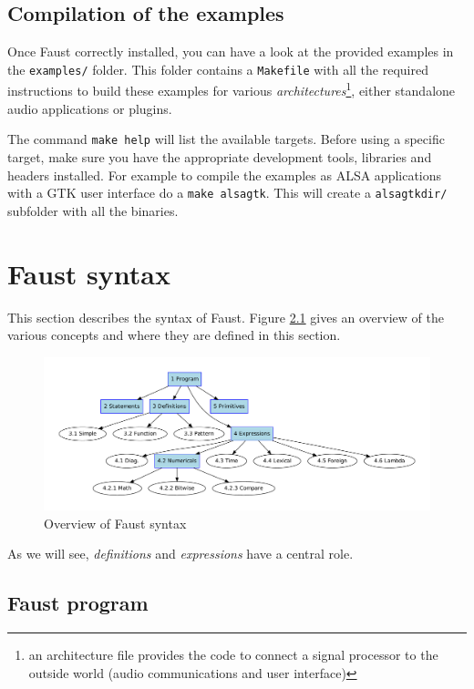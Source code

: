 \documentclass[a4paper]{book}
\begin{document}
\section{Compilation of the examples}
Once Faust correctly installed, you can have a look at the provided examples in the \lstinline'examples/' folder. This folder contains a  \lstinline'Makefile' with all the required instructions to build these examples for various \textit{architectures}\footnote{an architecture file provides the code to connect a signal processor to the outside world (audio communications and user interface)}, either standalone audio applications or plugins.

The command \lstinline'make help' will list the available targets. Before using a specific target, make sure you have the appropriate development tools, libraries and headers installed. For example to compile the examples as ALSA applications with a GTK user interface do a \lstinline'make alsagtk'. This will create a \lstinline'alsagtkdir/' subfolder with all the binaries. 


\chapter{Faust syntax}

This section describes the syntax of Faust. Figure \ref{fig:syntax} gives an overview of the various concepts and where they are defined in this section. 

\begin{figure}[ht!]
\centering
\includegraphics[scale=0.45]{illustrations/syntax-chart}
\caption{Overview of Faust syntax}
\label{fig:syntax}
\end{figure}

As we will see, \textit{definitions} and \textit{expressions} have a central role.

\section{Faust program}
\end{document}
